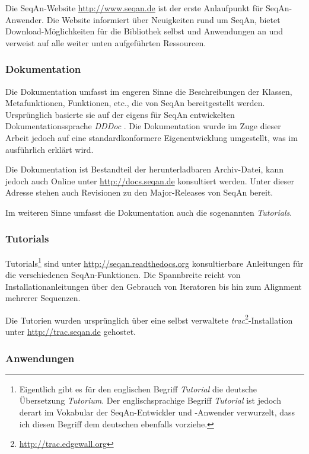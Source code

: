 Die SeqAn-Website \url{http://www.seqan.de} ist der erste Anlaufpunkt für SeqAn-Anwender. Die Website informiert über Neuigkeiten rund um SeqAn, bietet Download-Möglichkeiten für die Bibliothek selbst und Anwendungen an und verweist auf alle weiter unten aufgeführten Ressourcen.

\subsubsection{Dokumentation}

Die Dokumentation umfasst im engeren Sinne die Beschreibungen der Klassen, Metafunktionen, Funktionen, etc., die von SeqAn bereitgestellt werden. Ursprünglich basierte sie auf der eigens für SeqAn entwickelten Dokumentationssprache \textit{DDDoc} \citep{GogolDoring:2009vz}. Die Dokumentation wurde im Zuge dieser Arbeit jedoch auf eine standardkonformere Eigenentwicklung umgestellt, was im  ausführlich erklärt wird.

Die Dokumentation ist Bestandteil der herunterladbaren Archiv-Datei, kann jedoch auch Online unter \url{http://docs.seqan.de} konsultiert werden. Unter dieser Adresse stehen auch Revisionen zu den Major-Releases von SeqAn bereit.

Im weiteren Sinne umfasst die Dokumentation auch die sogenannten \textit{Tutorials}.

\subsubsection{Tutorials}

Tutorials\footnote{Eigentlich gibt es für den englischen Begriff \textit{Tutorial} die deutsche Übersetzung \textit{Tutorium}. Der englischsprachige Begriff \textit{Tutorial} ist jedoch derart im Vokabular der SeqAn-Entwickler und -Anwender verwurzelt, dass ich diesen Begriff dem deutschen ebenfalls vorziehe.} sind unter \url{http://seqan.readthedocs.org} konsultierbare Anleitungen für die verschiedenen SeqAn-Funktionen. Die Spannbreite reicht von Installationanleitungen über den Gebrauch von Iteratoren bis hin zum Alignment mehrerer Sequenzen.

Die Tutorien wurden ursprünglich über eine selbst verwaltete \textit{trac}\footnote{\url{http://trac.edgewall.org}}-Installation unter \url{http://trac.seqan.de} gehostet.


\subsubsection{Anwendungen}
\label{sec:seqan-tools}

